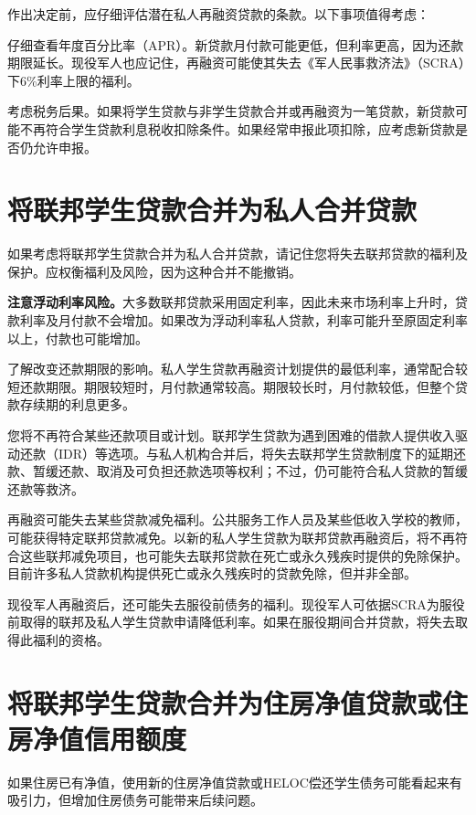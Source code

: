 \documentclass[UTF8,fontset=none,11pt,a4paper]{ctexart}
\begin{document}
作出决定前，应仔细评估潜在私人再融资贷款的条款。以下事项\allowbreak\mbox{值得考虑：}


仔细查看年度百分比率（APR）。新贷款月付款可能更低，但利率更高，因为还款期限延长。现役军人也应记住，再融资可能使其失去《军人民事救济法》（SCRA）下6\%利率上限\allowbreak\mbox{的福利。}


考虑税务后果。如果将学生贷款与非学生贷款合并或再融资为一笔贷款，新贷款可能不再符合学生贷款利息税收扣除条件。如果经常申报此项扣除，应考虑新贷款是否仍\allowbreak\mbox{允许申报。}


\section*{将联邦学生贷款合并为私人合并贷款}
如果考虑将联邦学生贷款合并为私人合并贷款，请记住您将失去联邦贷款的福利及保护。应权衡福利及风险，因为这种合并\allowbreak\mbox{不能撤销。}


\textbf{注意浮动利率风险。}大多数联邦贷款采用固定利率，因此未来市场利率上升时，贷款利率及月付款不会增加。如果改为浮动利率私人贷款，利率可能升至原固定利率以上，付款也\allowbreak\mbox{可能增加。}


了解改变还款期限的影响。私人学生贷款再融资计划提供的最低利率，通常配合较短还款期限。期限较短时，月付款通常较高。期限较长时，月付款较低，但整个贷款存续期的\allowbreak\mbox{利息更多。}


您将不再符合某些还款项目或计划。联邦学生贷款为遇到困难的借款人提供收入驱动还款（IDR）等选项。与私人机构合并后，将失去联邦学生贷款制度下的延期还款、暂缓还款、取消及可负担还款选项等权利；不过，仍可能符合私人贷款的暂缓还\allowbreak\mbox{款等救济。}


再融资可能失去某些贷款减免福利。公共服务工作人员及某些低收入学校的教师，可能获得特定联邦贷款减免。以新的私人学生贷款为联邦贷款再融资后，将不再符合这些联邦减免项目，也可能失去联邦贷款在死亡或永久残疾时提供的免除保护。目前许多私人贷款机构提供死亡或永久残疾时的贷款免除，但\allowbreak\mbox{并非全部。}


现役军人再融资后，还可能失去服役前债务的福利。现役军人可依据SCRA为服役前取得的联邦及私人学生贷款申请降低利率。如果在服役期间合并贷款，将失去取得此福\allowbreak\mbox{利的资格。}


\section*{将联邦学生贷款合并为住房净值贷款或住房净值信用额度}
如果住房已有净值，使用新的住房净值贷款或HELOC偿还学生债务可能看起来有吸引力，但增加住房债务可能带来\allowbreak\mbox{后续问题。}
\end{document}
